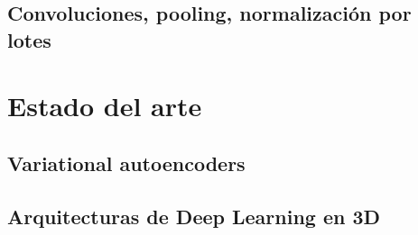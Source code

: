 \documentclass[spanish]{article}
\begin{document}
\subsection{Convoluciones, pooling, normalización por lotes}

\section{Estado del arte}

\subsection{Variational autoencoders}

\subsection{Arquitecturas de Deep Learning en 3D}
\end{document}
